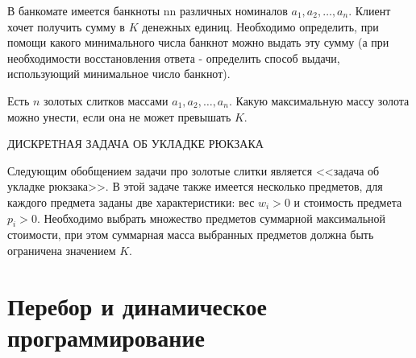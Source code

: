 \documentclass[14pt]{book}
\begin{document}
В банкомате имеется банкноты nn различных номиналов $a_1, a_2, \ldots, a_n$. Клиент хочет получить сумму в $K$ денежных единиц. Необходимо определить, при помощи какого минимального числа банкнот можно выдать эту сумму (а при необходимости восстановления ответа - определить способ выдачи, использующий минимальное число банкнот).

Есть $n$ золотых слитков массами $a_1, a_2, \ldots, a_n$. Какую максимальную массу золота можно унести, если она не может превышать $K$.

ДИСКРЕТНАЯ ЗАДАЧА ОБ УКЛАДКЕ РЮКЗАКА

Следующим обобщением задачи про золотые слитки является <<задача об укладке рюкзака>>. В этой задаче также имеется несколько предметов, для каждого предмета заданы две характеристики: вес $w_i > 0$ и стоимость предмета $p_i > 0$. Необходимо выбрать множество предметов суммарной максимальной стоимости, при этом суммарная масса выбранных предметов должна быть ограничена значением $K$.

\chapter{Перебор и динамическое программирование}
\end{document}
